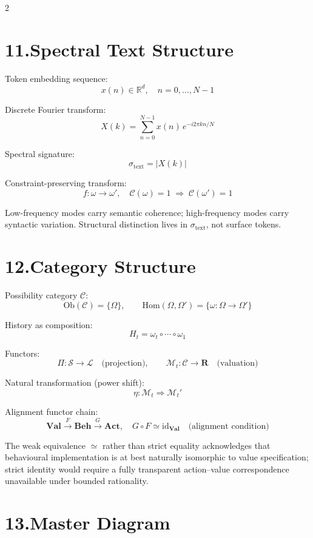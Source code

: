 \documentclass[10pt,a4paper]{article}
\theoremstyle{plain}
\theoremstyle{remark}
\newcommand{\C}{\mathcal{C}}
\newcommand{\M}{\mathcal{M}}
\begin{document}
\begin{multicols}{2}
\section*{11.\enspace Spectral Text Structure}

Token embedding sequence:
\[
x(n)
\in
\mathbb{R}^d,
\quad
n = 0,\dots,N-1
\]

Discrete Fourier transform:
\[
X(k)
=
\sum_{n=0}^{N-1}
x(n)\,e^{-i2\pi kn/N}
\]

Spectral signature:
\[
\sigma_{\mathrm{text}}
=
\bigl|X(k)\bigr|
\]

Constraint-preserving transform:
\[
f:\omega\to\omega',
\quad
\mathcal{C}(\omega)=1
\;\Rightarrow\;
\mathcal{C}(\omega')=1
\]

Low-frequency modes carry semantic coherence;
high-frequency modes carry syntactic variation.
Structural distinction lives in $\sigma_{\mathrm{text}}$, not surface tokens.

\section*{12.\enspace Category Structure}

Possibility category $\C$:
\[
\mathrm{Ob}(\C)=\{\Omega\},
\qquad
\mathrm{Hom}(\Omega,\Omega')=\{\omega:\Omega\to\Omega'\}
\]

History as composition:
\[
H_t
=
\omega_t\circ\cdots\circ\omega_1
\]

Functors:
\[
\Pi:\mathcal{S}\to\mathcal{L}
\quad\text{(projection)},
\qquad
\M_t:\C\to\mathbf{R}
\quad\text{(valuation)}
\]

Natural transformation (power shift):
\[
\eta:\M_t
\Rightarrow
\M_t'
\]

Alignment functor chain:
\[
\mathbf{Val}
\xrightarrow{F}
\mathbf{Beh}
\xrightarrow{G}
\mathbf{Act},
\quad
G\circ F \simeq \mathrm{id}_{\mathbf{Val}}
\quad\text{(alignment condition)}
\]

The weak equivalence $\simeq$ rather than strict equality acknowledges that
behavioural implementation is at best naturally isomorphic to value specification;
strict identity would require a fully transparent action--value correspondence
unavailable under bounded rationality.

\section*{13.\enspace Master Diagram}


\end{multicols}
\end{document}
